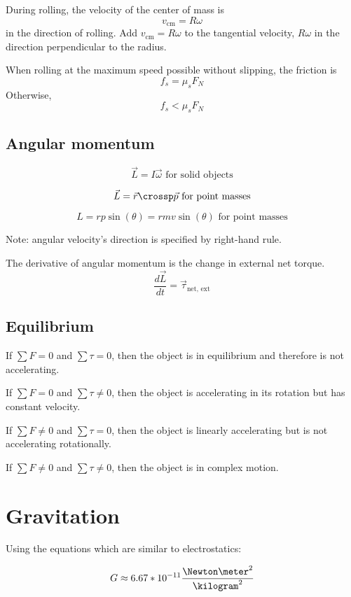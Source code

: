 During rolling, the velocity of the center of mass is
\[
	v_\text{cm} = R\omega
\]
in the direction of rolling. Add $v_\text{cm} = R\omega$ to the tangential velocity, $R\omega$ in the direction perpendicular to the radius.

When rolling at the maximum speed possible without slipping, the friction is
\[
	f_s = \mu_s F_N
\]
Otherwise,
\[
	f_s < \mu_s F_N
\]

\subsection{Angular momentum}

\[
	\vec{L} = I \vec{\omega} \text{ for solid objects}
\]

\[
	\vec{L} = \vec{r} \crossp \vec{p} \text{ for point masses}
\]

\[
	L = rp\sin(\theta) = rmv\sin(\theta) \text{ for point masses}
\]

Note: angular velocity's direction is specified by right-hand rule.

The derivative of angular momentum is the change in external net torque.
\[
	\frac{d\vec{L}}{dt} = \vec{\tau}_\text{net, ext}
\]

\subsection{Equilibrium}

If $\sum F = 0$ and $\sum \tau = 0$, then the object is in equilibrium and therefore is not accelerating.

If $\sum F = 0$ and $\sum \tau \neq 0$, then the object is accelerating in its rotation but has constant velocity.

If $\sum F \neq 0$ and $\sum \tau = 0$, then the object is linearly accelerating but is not accelerating rotationally.

If $\sum F \neq 0$ and $\sum \tau \neq 0$, then the object is in complex motion.

\section{Gravitation}

Using the equations which are similar to electrostatics:

\begin{definition}
	\[
		G \approx 6.67 * 10^{-11} \frac{\Newton \meter^2}{\kilogram^2}
	\]
\end{definition}

